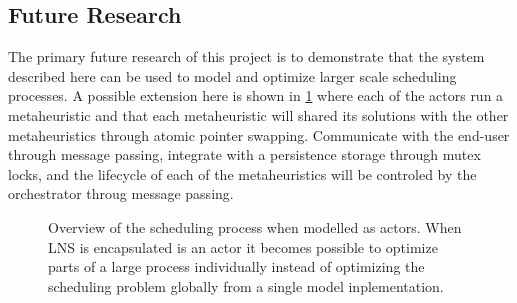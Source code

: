 \begin{figure}[H]
	
\end{figure}

\subsection{Future Research}
The primary future research of this project is to demonstrate that the system described here can be 
used to model and optimize larger scale scheduling processes. A possible extension here is shown in
\ref{fig:ordinator-architecture} where each of 
the actors run a metaheuristic and that each metaheuristic will shared its solutions with the 
other metaheuristics through atomic pointer swapping. Communicate with the end-user through message
passing, integrate with a persistence storage through mutex locks, and the lifecycle of each of the 
metaheuristics will be controled by the orchestrator throug message passing.

\begin{figure}[H]
	\centering
	
	\caption{
		Overview of the scheduling process when modelled as actors. When LNS is encapsulated 
		is an actor it becomes possible to optimize parts of a large process individually instead of 
		optimizing the scheduling problem globally from a single model inplementation.
	}
	\label{fig:ordinator-architecture}
\end{figure}
